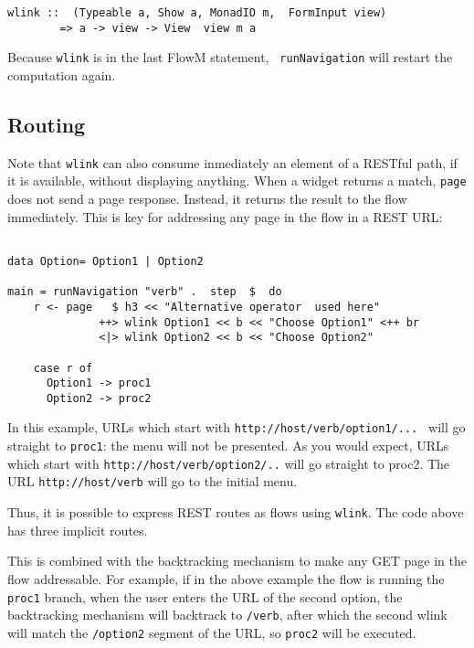 \documentclass{tmr}
\begin{document}
{\tt 
 
\begin{verbatim} 
wlink ::  (Typeable a, Show a, MonadIO m,  FormInput view) 
        => a -> view -> View  view m a 
\end{verbatim} 
 
} 
Because {\tt wlink} is in the last FlowM statement, {\tt 
runNavigation} will restart the computation again. 
 
\subsection{Routing} 
Note that {\tt wlink} can also consume inmediately an element of a RESTful path, if it is available, without displaying anything. When a widget returns a match, {\tt page} does not send a page response. Instead, it returns the result to the flow immediately. This is key for addressing any page in the flow in a REST URL\@: 
 
{\tt 
 
\begin{verbatim} 
 
data Option= Option1 | Option2 
 
main = runNavigation "verb" .  step  $  do 
    r <- page   $ h3 << "Alternative operator  used here" 
              ++> wlink Option1 << b << "Choose Option1" <++ br 
              <|> wlink Option2 << b << "Choose Option2" 
 
    case r of 
      Option1 -> proc1 
      Option2 -> proc2 
\end{verbatim} 
 
} 
 
In this example, URLs which start with {\tt http://host/verb/option1/... } will go straight to {\tt proc1}:  the menu will not be presented.  As you would expect, URLs which start with {\tt http://host/verb/option2/..} will go straight to proc2.  The URL {\tt http://host/verb} will go to the initial menu. 
 
Thus, it is possible to express REST routes as flows using {\tt wlink}. The code above has three implicit routes. 
 
This is combined with the backtracking mechanism to make any GET page in the flow addressable. For example, if in the above example the flow is running the {\tt proc1} branch, when the user enters the URL of the second option, the backtracking mechanism will backtrack to {\tt /verb}, after which the second wlink will match the {\tt /option2} segment of the URL, so {\tt proc2} will be executed. 
 
\end{document}
